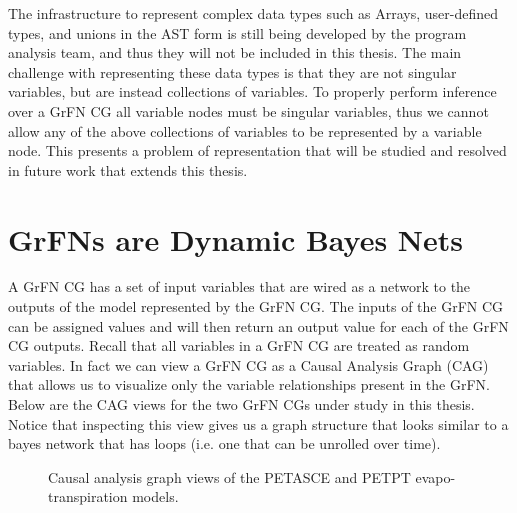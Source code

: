 The infrastructure to represent complex data types such as Arrays, user-defined types, and unions in the AST form is still being developed by the program analysis team, and thus they will not be included in this thesis. The main challenge with representing these data types is that they are not singular variables, but are instead collections of variables. To properly perform inference over a GrFN CG all variable nodes must be singular variables, thus we cannot allow any of the above collections of variables to be represented by a variable node. This presents a problem of representation that will be studied  and resolved in future work that extends this thesis.

\section{GrFNs are Dynamic Bayes Nets\label{sec:grfn_as_dbn}}
A GrFN CG has a set of input variables that are wired as a network to the outputs of the model represented by the GrFN CG.
The inputs of the GrFN CG can be assigned values and will then return an output value for each of the GrFN CG outputs.
Recall that all variables in a GrFN CG are treated as random variables.
In fact we can view a GrFN CG as a Causal Analysis Graph (CAG) that allows us to visualize only the variable relationships present in the GrFN.
Below are the CAG views for the two GrFN CGs under study in this thesis. Notice that inspecting this view gives us a graph structure that looks similar to a bayes network that has loops (i.e. one that can be unrolled over time).

\FloatBarrier
\begin{figure}[!htbp]
    \label{cag_viz}
    \centering
    \caption[CAG Visualizations]{Causal analysis graph views of the PETASCE and PETPT evapo-transpiration models.}
\end{figure}
\FloatBarrier

